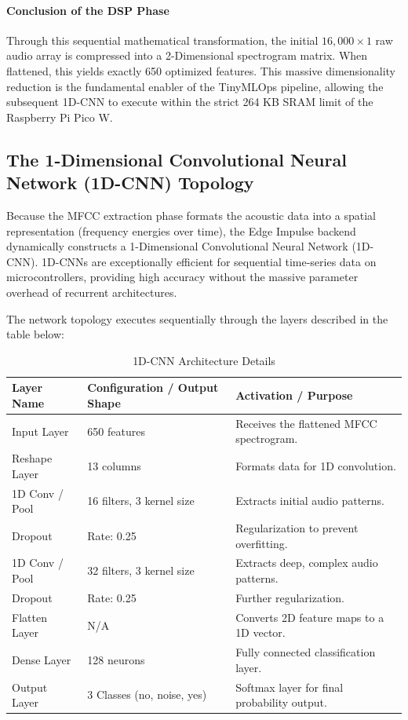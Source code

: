 \documentclass[11pt,a4paper,openany]{book}
\begin{document}
\FloatBarrier


\paragraph{Conclusion of the DSP Phase}
Through this sequential mathematical transformation, the initial $16,000 \times 1$ raw audio array is compressed into a 2-Dimensional spectrogram matrix. When flattened, this yields exactly 650 optimized features. This massive dimensionality reduction is the fundamental enabler of the TinyMLOps pipeline, allowing the subsequent 1D-CNN to execute within the strict 264 KB SRAM limit of the Raspberry Pi Pico W.

\subsection{The 1-Dimensional Convolutional Neural Network (1D-CNN) Topology}
Because the MFCC extraction phase formats the acoustic data into a spatial representation (frequency energies over time), the Edge Impulse backend dynamically constructs a 1-Dimensional Convolutional Neural Network (1D-CNN). 1D-CNNs are exceptionally efficient for sequential time-series data on microcontrollers, providing high accuracy without the massive parameter overhead of recurrent architectures.

The network topology executes sequentially through the layers described in the table below:

\vspace{1em}

\begin{table}[!ht]
\centering
\caption{1D-CNN Architecture Details}
\label{tab:1dcnn_arch}
\renewcommand{\arraystretch}{1.3} 
\begin{tabular}{|l|l|p{6.5cm}|}
\hline
\textbf{Layer Name} & \textbf{Configuration / Output Shape} & \textbf{Activation / Purpose} \\ \hline
Input Layer & 650 features & Receives the flattened MFCC spectrogram. \\ \hline
Reshape Layer & 13 columns & Formats data for 1D convolution. \\ \hline
1D Conv / Pool & 16 filters, 3 kernel size & Extracts initial audio patterns. \\ \hline
Dropout & Rate: 0.25 & Regularization to prevent overfitting. \\ \hline
1D Conv / Pool & 32 filters, 3 kernel size & Extracts deep, complex audio patterns. \\ \hline
Dropout & Rate: 0.25 & Further regularization. \\ \hline
Flatten Layer & N/A & Converts 2D feature maps to a 1D vector. \\ \hline
Dense Layer & 128 neurons & Fully connected classification layer. \\ \hline
Output Layer & 3 Classes (no, noise, yes) & Softmax layer for final probability output. \\ \hline
\end{tabular}
\end{table}
\end{document}
